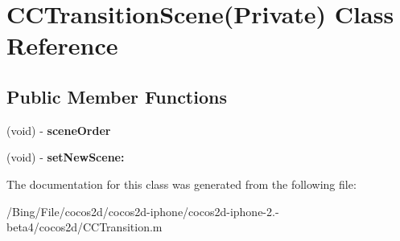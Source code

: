 \hypertarget{interface_c_c_transition_scene_07_private_08}{\section{C\-C\-Transition\-Scene(Private) Class Reference}
\label{interface_c_c_transition_scene_07_private_08}
}
\subsection*{Public Member Functions}
\begin{DoxyCompactItemize}
\item 
\hypertarget{interface_c_c_transition_scene_07_private_08_a2e9a973c6aeb528f31b07692fa9fa703}{(void) -\/ {\bfseries scene\-Order}}\label{interface_c_c_transition_scene_07_private_08_a2e9a973c6aeb528f31b07692fa9fa703}

\item 
\hypertarget{interface_c_c_transition_scene_07_private_08_a06ff5346b960d35d8bcdf4a214dad353}{(void) -\/ {\bfseries set\-New\-Scene\-:}}\label{interface_c_c_transition_scene_07_private_08_a06ff5346b960d35d8bcdf4a214dad353}

\end{DoxyCompactItemize}


The documentation for this class was generated from the following file\-:\begin{DoxyCompactItemize}
\item 
/\-Bing/\-File/cocos2d/cocos2d-\/iphone/cocos2d-\/iphone-\/2.-\/beta4/cocos2d/C\-C\-Transition.\-m\end{DoxyCompactItemize}
